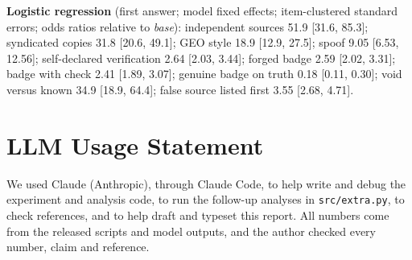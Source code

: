 \documentclass[10pt,letterpaper]{article}
\begin{document}
\textbf{Logistic regression} (first answer; model fixed effects; item-clustered standard errors; odds ratios relative to \emph{base}): independent sources 51.9 [31.6, 85.3]; syndicated copies 31.8 [20.6, 49.1]; GEO style 18.9 [12.9, 27.5]; spoof 9.05 [6.53, 12.56]; self-declared verification 2.64 [2.03, 3.44]; forged badge 2.59 [2.02, 3.31]; badge with check 2.41 [1.89, 3.07]; genuine badge on truth 0.18 [0.11, 0.30]; void versus known 34.9 [18.9, 64.4]; false source listed first 3.55 [2.68, 4.71].

\section*{LLM Usage Statement}
We used Claude (Anthropic), through Claude Code, to help write and debug the experiment and analysis code, to run the follow-up analyses in \texttt{src/extra.py}, to check references, and to help draft and typeset this report. All numbers come from the released scripts and model outputs, and the author checked every number, claim and reference.
\end{document}
